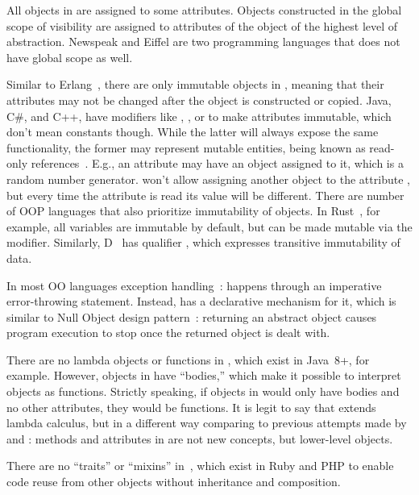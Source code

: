 %
All objects in \eo{} are assigned to some attributes. Objects constructed
in the global scope of visibility are assigned to attributes of the
 object of the highest level of abstraction.
Newspeak and Eiffel are two programming languages that does not have global scope as well.

%
Similar to Erlang~\citep{armstrong2010erlang},
there are only immutable objects in \eo{}, meaning that their attributes may
not be changed after the object is constructed or copied.
Java, C\#, and C++, have modifiers like
, , or  to make attributes immutable, which
don't mean constants though. While the latter will
always expose the same functionality, the former may represent mutable
entities, being known as read-only references~\citep{birka2004practical}.
E.g., an attribute  may have an object 
assigned to it, which is a random number generator. \eo{} won't allow
assigning another object to the attribute , but every time
the attribute is read its value will be different.
%
There are number of OOP languages that also prioritize immutability of objects.
In Rust~\citep{matsakis2014rust}, for example, all variables are immutable by
default, but can be made mutable via the  modifier. Similarly,
D~\citep{bright2020origins} has qualifier , which expresses
transitive immutability of data.

%
In most OO languages exception handling~\citep{goodenough1975exception}:
happens through an imperative error-throwing statement.
Instead, \eo{} has a declarative mechanism for it, which
is similar to Null Object design pattern~\citep{martin1997pattern}: returning
an abstract object causes program execution to stop once the returned
object is dealt with.

%
There are no lambda objects or functions in \eo{}, which exist in Java~8+, for example.
However, objects in \eo{} have ``bodies,'' which make it possible to interpret
objects as functions.
Strictly speaking, if objects in \eo{} would only have bodies and no other attributes,
they would be functions. It is legit to
say that \eo{} extends lambda calculus, but in a different way
comparing to previous attempts made by~\citet{mitchell1993lambda} and \citet{di1998lambda}:
methods and attributes in \eo{} are not new concepts, but lower-level
objects.

%
There are no ``traits'' or ``mixins'' in~\eo{}, which exist in Ruby and PHP to enable
code reuse from other objects without inheritance and composition.




